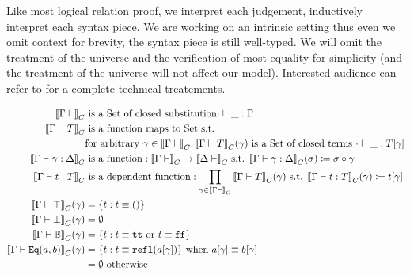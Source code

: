 Like most logical relation proof,  we interpret each judgement, inductively interpret each syntax piece. We are working on an intrinsic setting thus even we omit context for brevity, the syntax piece is still well-typed. We will omit the treatment of the universe and the verification of most equality for simplicity (and the treatment of the universe will not affect our model). Interested audience can refer to \citet{kaposi2019gluing, coquand2018canonicity,sterling2019algebraic} for a complete technical treatements.

\begin{align*}
  \denotesC{\goodCtx{\Gm}{i}} & \text{ is a Set of closed substitution} \goodSub{\cdot}{\_}{\Gm} \\
  \denotesC{\goodType{\Gm}{T}{}} & \text{ is a function maps to Set s.t.} \\
  & \text{for arbitrary } \gm \in \denotesC{\goodCtx{\Gm}{}}, \denotesC{\goodType{\Gm}{T}{}}(\gm) \text{ is a Set of closed terms } \goodTerm{\cdot}{\_}{\sub{T}{\gm}} \\ 
  \denotesC{\goodSub{\Gm}{\gm}{\Delta}} & \text{ is a function}: \denotesC{\goodCtx{\Gm}{i}} \to \denotesC{\goodCtx{\Delta}{i}} \text{ s.t. } \denotesC{\goodSub{\Gm}{\gm}{\Delta}}(\sigma) \coloneqq \SubstComp{\sigma}{\gm} \\
  \denotesC{\goodTerm{\Gm}{t}{T}} & \text{ is a dependent function}: \prod_{\gm \in \denotesC{\goodCtx{\Gm}{i}}}\denotesC{\goodType{\Gm}{T}{}}(\gm)  \text{ s.t. } \denotesC{\goodTerm{\Gm}{t}{T}}(\gm) \coloneqq \sub{t}{\gm} \\
  \denotesC{\goodType{\Gm}{\top}{}}(\gm) &= \{t : t \equiv \unit \} \\
  \denotesC{\goodType{\Gm}{\bot}{}}(\gm) &= \emptyset \\
  \denotesC{\goodType{\Gm}{\cB}{}}(\gm) &= \{t : t \equiv \true \text{ or } t \equiv\false \} \\
  \denotesC{\goodType{\Gm}{\TyId{a}{b}}{}}(\gm) &= \{t : t \equiv \eqrefl{\sub{a}{\gm}} \} \text{ when } \sub{a}{\gm} \equiv \sub{b}{\gm} \\ 
  &= \emptyset \text{ otherwise } \\ 

\end{align*}
